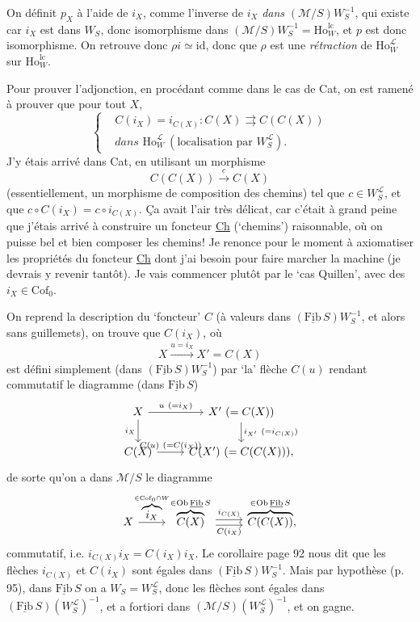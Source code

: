 \documentclass[11pt]{article}
\newcommand{\printedpage}[1]{\marginpar{\footnotesize p.~#1}}
\newcommand{\msp}[1]{\marginpar{\footnotesize [#1]}}
\newcommand{\Ho}{\mathrm{Ho}}
\newcommand{\Fibu}{\underline{\mathrm{Fib}}\,}
\newcommand{\WL}{W_S^{\mathcal{L}}}
\begin{document}
On définit $p_X$ à l'aide de $i_X$, comme l'inverse de $i_X$ \textit{dans} $(\mathcal{M}/S)W_S^{-1}$, qui existe car \msp{page 99} $i_X$ est dans $W_S$, donc isomorphisme dans $(\mathcal{M}/S)W_S^{-1} = \Ho_W^{\mathrm{lc}}$, et $p$ est donc isomorphisme. On retrouve donc $\rho i \simeq \mathrm{id}$, donc que $\rho$ est une \textit{rétraction} de $\Ho_W^{\mathcal{L}}$ sur $\Ho_W^{\mathrm{lc}}$.

Pour prouver l'adjonction, en procédant comme dans le cas de Cat, on est ramené à prouver que pour tout $X$,
\[
\left\{
\begin{aligned}
&C(i_X) = i_{C(X)} : C(X) \rightrightarrows C(C(X))\\
&\textit{dans } \Ho_W^{\mathcal{L}} \ (\text{localisation par } \WL).
\end{aligned}
\right.
\]
J'y étais arrivé dans Cat, en utilisant un morphisme
\[
C(C(X)) \xrightarrow{\ c\ } C(X)
\]
(essentiellement, un morphisme de composition des chemins) tel que $c \in \WL$, et que $c \circ C(i_X) = c \circ i_{C(X)}$. Ça avait l'air très délicat, car c'était à grand peine que j'étais arrivé à construire un foncteur \underline{Ch} (`chemins') raisonnable, où on puisse bel et bien composer les chemins! Je renonce pour le moment à axiomatiser les propriétés du foncteur \underline{Ch} dont j'ai besoin pour faire marcher la machine (je devrais y revenir tantôt). Je vais commencer plutôt par le `cas Quillen', avec des $i_X \in \mathrm{Cof}_0$.

\printedpage{63}
\msp{page 100}

On reprend la description du `foncteur' $C$ (à valeurs dans $(\Fibu S)W_S^{-1}$, et alors sans guillemets), on trouve que $C(i_X)$, où
\[
X \xrightarrow{u = i_X} X' = C(X)
\]
est défini simplement (dans $(\Fibu S)W_S^{-1}$) par `la' flèche $C(u)$ rendant commutatif le diagramme (dans $\Fibu S$)
\[
\begin{tikzcd}
X \arrow[r, "u\ (=i_X)"] \arrow[d, "i_X"'] & X'\ (= C(X)) \arrow[d, "i_{X'}\ (=i_{C(X)})"] \\
C(X) \arrow[r, "C(u)\ (=C(i_X))"] & C(X')\ (= C(C(X))),
\end{tikzcd}
\]
de sorte qu'on a dans $\mathcal{M}/S$ le diagramme
\[
\begin{tikzcd}
X \arrow[r, "\overbrace{i_X}^{\in\mathrm{Cof}_0\cap W}"] & \overbrace{C(X)}^{\in\mathrm{Ob}\,\Fibu S} \arrow[r, shift left, "i_{C(X)}"] \arrow[r, shift right, "C(i_X)"'] & \overbrace{C(C(X))}^{\in\mathrm{Ob}\,\Fibu S},
\end{tikzcd}
\]
commutatif, i.e. $i_{C(X)}i_X = C(i_X)i_X$. Le corollaire page 92 nous dit que les flèches $i_{C(X)}$ et $C(i_X)$ sont égales dans $(\Fibu S)W_S^{-1}$. Mais par hypothèse (p. 95), dans $\Fibu S$ on a $W_S = \WL$, donc les flèches sont égales dans $(\Fibu S)(\WL)^{-1}$, et a fortiori dans $(\mathcal{M}/S)(\WL)^{-1}$, et on gagne.
\end{document}

